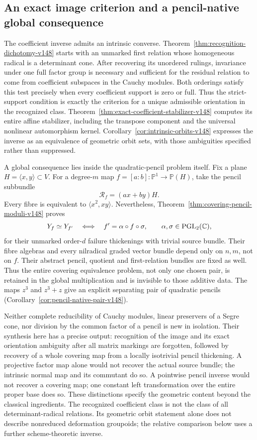 \documentclass[11pt,reqno]{amsart}
\numberwithin{equation}{section}
\theoremstyle{definition}\newtheorem{definition}[theorem]{Definition}
\theoremstyle{remark}\newtheorem{remark}[theorem]{Remark}
\newcommand{\C}{\mathbb C}\newcommand{\Q}{\mathbb Q}
\newcommand{\Pj}{\mathbb P}\newcommand{\A}{\mathbb A}
\begin{document}
\subsection{An exact image criterion and a pencil-native global consequence}
The coefficient inverse admits an intrinsic converse.
Theorem~\ref{thm:recognition-dichotomy-v148} starts with an
unmarked first relation whose homogeneous radical is a determinant
cone.  After recovering its unordered rulings, invariance under one
full factor group is necessary and sufficient for the residual
relation to come from coefficient subspaces in the Cauchy modules.
Both orderings satisfy this test precisely when every coefficient
support is zero or full.  Thus the strict-support condition is
exactly the criterion for a unique admissible orientation in the
recognized class.  Theorem~\ref{thm:exact-coefficient-stabilizer-v148}
computes its entire affine stabilizer, including the transpose
component and the universal nonlinear automorphism kernel.
Corollary~\ref{cor:intrinsic-orbits-v148} expresses the inverse as
an equivalence of geometric orbit sets, with those ambiguities
specified rather than suppressed.

A global consequence lies inside the quadratic-pencil problem
itself.  Fix a plane \(H=\langle x,y\rangle\subset V\).
For a degree-\(m\) map \(f=[a:b]:\Pj^1\to\Pj(H)\), take
the pencil subbundle
\[
                  \mathcal R_f=(ax+by)H.
\]
Every fibre is equivalent to \(\langle x^2,xy\rangle\).
Nevertheless, Theorem~\ref{thm:covering-pencil-moduli-v148} proves
\[
 Y_f\simeq Y_{f'}\quad\Longleftrightarrow\quad
 f'=\alpha\circ f\circ\sigma,\qquad
                         \alpha,\sigma\in\PGL_2(\C),
\]
for their unmarked order-\(d\) failure thickenings with trivial
source bundle.  Their fibre algebras and every nilradical graded
vector bundle depend only on \(n,m\), not on \(f\).
Their abstract pencil, quotient and first-relation bundles are
fixed as well.  Thus the entire covering equivalence problem, not
only one chosen pair, is retained in the global multiplication and
is invisible to those additive data.  The maps \(z^3\) and
\(z^3+z\) give an explicit separating pair of quadratic pencils
(Corollary~\ref{cor:pencil-native-pair-v148}).

Neither complete reducibility of Cauchy modules, linear preservers
of a Segre cone, nor division by the common factor of a pencil is
new in isolation.  Their synthesis here has a precise output:
recognition of the image and its exact orientation ambiguity after
all matrix markings are forgotten, followed by recovery of a
whole covering map from a locally isotrivial pencil thickening.
A projective factor map alone would not recover the actual source
bundle; the intrinsic normal map and its commutant do so.  A
pointwise pencil inverse would not recover a covering map; one
constant left transformation over the entire proper base does so.
These distinctions specify the geometric content beyond the
classical ingredients.  The recognized coefficient class is not the
class of all determinant-radical relations.  Its geometric orbit
statement alone does not describe nonreduced deformation groupoids;
the relative comparison below uses a further scheme-theoretic inverse.
\end{document}

